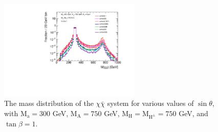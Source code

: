 \begin{figure}
  \centering
  \includegraphics[width=0.6\textwidth]{texinputs/04_grid/figures/DMHF/benchmarking/MDM_1_Ma_300_MA_750_tanb_1.0_SCAN_sinp_v2/mchichi.pdf}
  \caption{The mass distribution of the $\chi \bar{\chi}$ system for various values of $\sin\theta$, with $\mathrm{M_a}=300$ GeV, $\mathrm{M_A}=750$ GeV, $\mathrm{M_H}=\mathrm{M_{H^{\pm}}}=750$ GeV, and $\tan\beta=1$.}
  \label{fig:mchichi_sinp}
\end{figure} 

